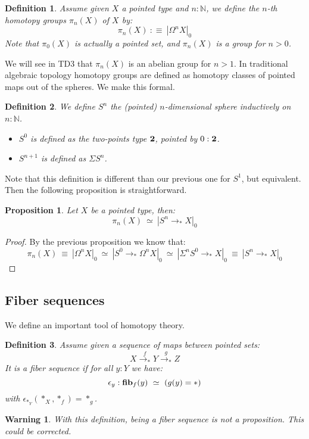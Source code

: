 \documentclass{article}
\newcommand{\sse}[1]{\medbreak \subsection{#1}}
\renewcommand{\r}{\rightarrow}
\newcommand{\fib}{\mathrm{\bf fib}}
\newcommand{\two}{{\bf 2}}
\newtheorem{definition}{Definition}
\newtheorem{proposition}{Proposition}
\newtheorem{warning}{\danger Warning}
\begin{document}
\begin{definition}
Assume given $X$ a pointed type and $n:\mathbb{N}$, we define the $n$-th \emph{homotopy groups} $\pi_n(X)$ of $X$ by:
\[\pi_n(X) \ :\equiv\ |\Omega^n X|_0\]
Note that $\pi_0(X)$ is actually a pointed set, and $\pi_n(X)$ is a group for $n>0$.
\end{definition}

We will see in TD3 that $\pi_n(X)$ is an abelian group for $n>1$. In traditional algebraic topology homotopy groups are defined as homotopy classes of pointed maps out of the spheres. We make this formal.

\begin{definition}
We define $S^n$ the (pointed) $n$-dimensional sphere inductively on $n:\mathbb{N}$. 
\begin{itemize}
\item $S^0$ is defined as the two-points type $\two$, pointed by $0:\two$.
\item $S^{n+1}$ is defined as $\Sigma S^n$.
\end{itemize}
\end{definition}

Note that this definition is different than our previous one for $S^1$, but equivalent. Then the following proposition is straightforward.

\begin{proposition}
Let $X$ be a pointed type, then:
\[\pi_n(X) \ \simeq \ |S^n\r_* X|_0\]
\end{proposition}
\begin{proof}
By the previous proposition we know that:
\[\pi_n(X) \ \equiv\ |\Omega^nX|_0 \ \simeq \ |S^0\r_*\Omega^nX|_0\ \simeq\ |\Sigma^nS^0\r_*X|_0 \ \equiv\ |S^n\r_*X|_0\]
\end{proof}


\sse{Fiber sequences}

We define an important tool of homotopy theory.

\begin{definition}
Assume given a sequence of maps between pointed sets:
\[X \overset{f}{\r_*} Y\overset{g}{\r_*} Z\]
It is a fiber sequence if for all $y:Y$ we have:
\[\epsilon_y : \fib_f(y) \ \simeq\ (g(y)=*)\]
with $\epsilon_{*_Y}(*_X,*_f) = *_g$.
\end{definition}

\begin{warning}
With this definition, being a fiber sequence is not a proposition. This could be corrected. 
\end{warning}
\end{document}
